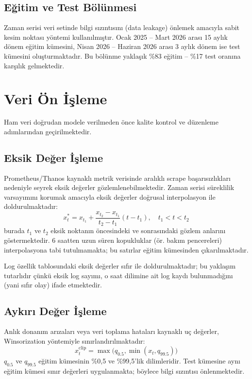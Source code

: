 \subsection{Eğitim ve Test Bölünmesi}

Zaman serisi veri setinde bilgi sızıntısını (data leakage) önlemek amacıyla sabit kesim noktası yöntemi kullanılmıştır.
Ocak 2025 -- Mart 2026 arası 15 aylık dönem eğitim kümesini, Nisan 2026 -- Haziran 2026 arası 3 aylık dönem ise test kümesini oluşturmaktadır.
Bu bölünme yaklaşık \%83 eğitim -- \%17 test oranına karşılık gelmektedir.


\section{Veri Ön İşleme}
\label{sec:onisleme}

Ham veri doğrudan modele verilmeden önce kalite kontrol ve düzenleme adımlarından geçirilmektedir.

\subsection{Eksik Değer İşleme}

Prometheus/Thanos kaynaklı metrik verisinde aralıklı scrape başarısızlıkları nedeniyle seyrek eksik değerler gözlemlenebilmektedir.
Zaman serisi süreklilik varsayımını korumak amacıyla eksik değerler doğrusal interpolasyon ile doldurulmaktadır:
\begin{equation}
    x_t^{*} = x_{t_1} + \frac{x_{t_2} - x_{t_1}}{t_2 - t_1}(t - t_1), \quad t_1 < t < t_2
    \label{eq:interpolation}
\end{equation}
burada $t_1$ ve $t_2$ eksik noktanın öncesindeki ve sonrasındaki gözlem anlarını göstermektedir.
6 saatten uzun süren kopukluklar (ör. bakım pencereleri) interpolasyona tabi tutulmamakta; bu satırlar eğitim kümesinden çıkarılmaktadır.

Log özellik tablosundaki eksik değerler sıfır ile doldurulmaktadır; bu yaklaşım tutarlıdır çünkü eksik log sayımı, o saat dilimine ait log kaydı bulunmadığını (yani sıfır olay) ifade etmektedir.

\subsection{Aykırı Değer İşleme}

Anlık donanım arızaları veya veri toplama hataları kaynaklı uç değerler, Winsorization yöntemiyle sınırlandırılmaktadır:
\begin{equation}
    x_t^{\text{clip}} = \max\!\bigl(q_{0.5}, \min(x_t, q_{99.5})\bigr)
    \label{eq:winsor}
\end{equation}
$q_{0.5}$ ve $q_{99.5}$ eğitim kümesinin \%0{,}5 ve \%99{,}5'lik dilimleridir.
Test kümesine aynı eğitim kümesi sınır değerleri uygulanmakta; böylece bilgi sızıntısı önlenmektedir.

